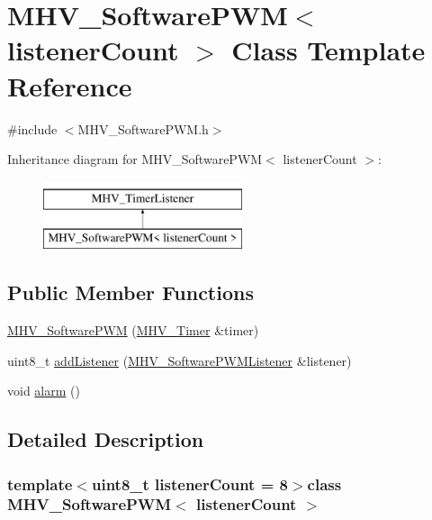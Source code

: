 \hypertarget{class_m_h_v___software_p_w_m}{\section{M\-H\-V\-\_\-\-Software\-P\-W\-M$<$ listener\-Count $>$ Class Template Reference}
\label{class_m_h_v___software_p_w_m}
}


{\ttfamily \#include $<$M\-H\-V\-\_\-\-Software\-P\-W\-M.\-h$>$}

Inheritance diagram for M\-H\-V\-\_\-\-Software\-P\-W\-M$<$ listener\-Count $>$\-:\begin{figure}[H]
\begin{center}
\leavevmode
\includegraphics[height=2.000000cm]{class_m_h_v___software_p_w_m}
\end{center}
\end{figure}
\subsection*{Public Member Functions}
\begin{DoxyCompactItemize}
\item 
\hyperlink{class_m_h_v___software_p_w_m_a9ea2aae4225d6dfbc49751e3fb8c23d0}{M\-H\-V\-\_\-\-Software\-P\-W\-M} (\hyperlink{class_m_h_v___timer}{M\-H\-V\-\_\-\-Timer} \&timer)
\item 
uint8\-\_\-t \hyperlink{class_m_h_v___software_p_w_m_aa9eb0a661aca583e20de5705a2538cfe}{add\-Listener} (\hyperlink{class_m_h_v___software_p_w_m_listener}{M\-H\-V\-\_\-\-Software\-P\-W\-M\-Listener} \&listener)
\item 
void \hyperlink{class_m_h_v___software_p_w_m_aef021dedf117628a95ff35eb2e0af0b0}{alarm} ()
\end{DoxyCompactItemize}


\subsection{Detailed Description}
\subsubsection*{template$<$uint8\-\_\-t listener\-Count = 8$>$class M\-H\-V\-\_\-\-Software\-P\-W\-M$<$ listener\-Count $>$}



